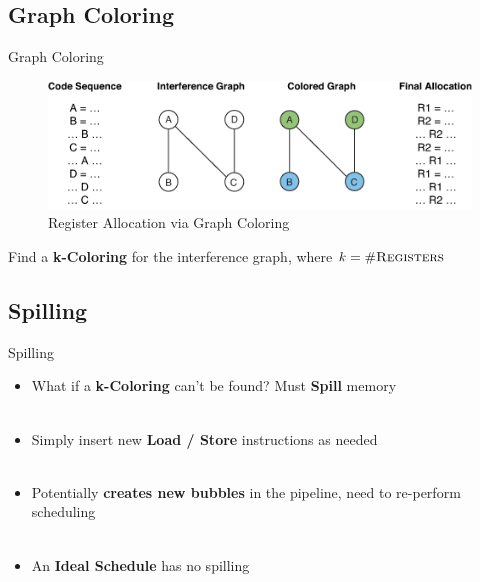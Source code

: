 \documentclass{beamer}
\begin{document}
\begin{darkframes}
\subsection{Graph Coloring}
\begin{frame}{Graph Coloring}
\begin{figure}
\includegraphics[scale=0.5]{figures/nshape}
\caption{Register Allocation via Graph Coloring}
\end{figure}
Find a {\bf \color{green} k-Coloring} for the interference graph, where {\bf \color{green} $k = \#\textsc{Registers}$}
\end{frame}

\subsection{Spilling}
\begin{frame}{Spilling}
	\begin{itemize}
		\item What if a {\bf \color{cyan} k-Coloring} can't be found? Must {\bf \color{green} Spill} memory \\
		\qquad \\
		\pause
		\item Simply insert new {\bf \color{cyan} Load / Store} instructions as needed \\
		\qquad \\
		\pause
		\item Potentially {\bf \color{cyan} creates new bubbles} in the pipeline, need to re-perform scheduling \\
		\qquad \\
		\pause
		\item An {\bf \color{cyan} Ideal Schedule} has no spilling 
	\end{itemize}
\end{frame}


\end{darkframes}
\end{document}

